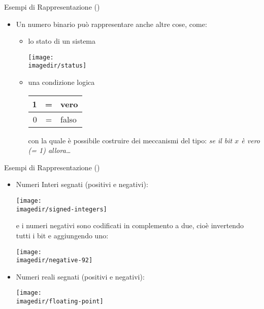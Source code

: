 \begin{slide}{Esempi di Rappresentazione ()}
{
	\begin{itemize}

		\item Un numero binario pu\`o rappresentare anche altre cose,
			come:

			\begin{itemize}
				\item lo stato di un sistema

					\begin{center}
					\texttt{[image: \\imagedir/status]}
					\end{center}

				\item una condizione logica
				{\scriptsize

					\begin{center}
					\begin{tabular}{| r  c l |}
						\hline
						1 & = & vero\\
						\hline
						0 & = & falso\\
						\hline
					\end{tabular}
					\end{center}
				}

					con la quale \`e possibile
					costruire dei meccanismi del tipo:
					\emph{se il bit $x$ \`e vero (= 1) allora\ldots}

			\end{itemize}

	\end{itemize}
}
\end{slide}

\begin{slide}{Esempi di Rappresentazione ()}
{
	\begin{itemize}

		\item Numeri Interi segnati (positivi e negativi):

			\begin{center}
				\texttt{[image: \\imagedir/signed-integers]}
			\end{center}

			e i numeri negativi sono codificati in complemento a
			due, cio\`e invertendo tutti i bit e aggiungendo uno:

			\begin{center}
				\texttt{[image: \\imagedir/negative-92]}
			\end{center}

		\vspace*{-5mm}
		\item Numeri reali segnati (positivi e negativi):

			\begin{center}
				\texttt{[image: \\imagedir/floating-point]}
			\end{center}

	\end{itemize}
}
\end{slide}
